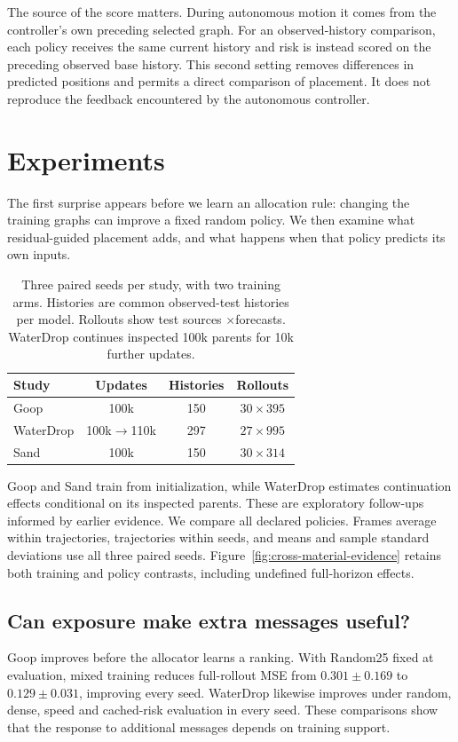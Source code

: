 The source of the score matters. During autonomous motion it comes from the controller's own preceding selected graph. For an observed-history comparison, each policy receives the same current history and risk is instead scored on the preceding observed base history. This second setting removes differences in predicted positions and permits a direct comparison of placement. It does not reproduce the feedback encountered by the autonomous controller.

\section{Experiments}
The first surprise appears before we learn an allocation rule: changing the training graphs can improve a fixed random policy. We then examine what residual-guided placement adds, and what happens when that policy predicts its own inputs.

\begin{table}[t]
\centering\small
\caption{Three paired seeds per study, with two training arms. Histories are common observed-test histories per model. Rollouts show test sources $\times$forecasts. WaterDrop continues inspected 100k parents for 10k further updates.}
\label{tab:study-overview}
\setlength{\tabcolsep}{3pt}
\begin{tabular}{lccc}
\toprule
Study & Updates & Histories & Rollouts\\
\midrule
Goop &100k&150&$30\times395$\\
WaterDrop &100k$\to$110k&297&$27\times995$\\
Sand &100k&150&$30\times314$\\
\bottomrule
\end{tabular}
\end{table}

Goop and Sand train from initialization, while WaterDrop estimates continuation effects conditional on its inspected parents. These are exploratory follow-ups informed by earlier evidence. We compare all declared policies. Frames average within trajectories, trajectories within seeds, and means and sample standard deviations use all three paired seeds. Figure~\ref{fig:cross-material-evidence} retains both training and policy contrasts, including undefined full-horizon effects.

\subsection{Can exposure make extra messages useful?}
Goop improves before the allocator learns a ranking. With Random25 fixed at evaluation, mixed training reduces full-rollout MSE from $0.301\pm0.169$ to $0.129\pm0.031$, improving every seed. WaterDrop likewise improves under random, dense, speed and cached-risk evaluation in every seed. These comparisons show that the response to additional messages depends on training support.

